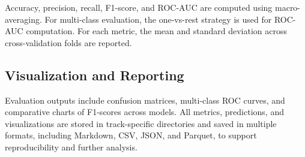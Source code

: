 Accuracy, precision, recall, \ac{F1}-score, and \ac{ROC}-\ac{AUC} are computed using macro-averaging. For multi-class evaluation, the one-vs-rest strategy is used for \ac{ROC}-\ac{AUC} computation. For each metric, the mean and standard deviation across cross-validation folds are reported.

\subsection{Visualization and Reporting}

Evaluation outputs include confusion matrices, multi-class \ac{ROC} curves, and comparative charts of \ac{F1}-scores across models. All metrics, predictions, and visualizations are stored in track-specific directories and saved in multiple formats, including Markdown, CSV, JSON, and Parquet, to support reproducibility and further analysis.
